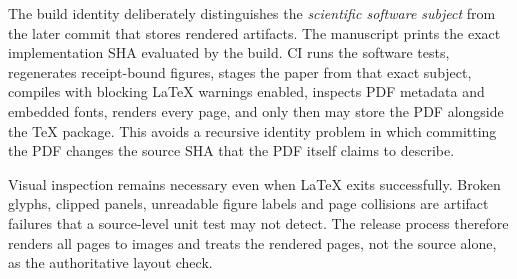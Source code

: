 The build identity deliberately distinguishes the \emph{scientific software subject} from the later commit that stores rendered artifacts. The manuscript prints the exact implementation SHA evaluated by the build. CI runs the software tests, regenerates receipt-bound figures, stages the paper from that exact subject, compiles with blocking LaTeX warnings enabled, inspects PDF metadata and embedded fonts, renders every page, and only then may store the PDF alongside the TeX package. This avoids a recursive identity problem in which committing the PDF changes the source SHA that the PDF itself claims to describe.

Visual inspection remains necessary even when LaTeX exits successfully. Broken glyphs, clipped panels, unreadable figure labels and page collisions are artifact failures that a source-level unit test may not detect. The release process therefore renders all pages to images and treats the rendered pages, not the source alone, as the authoritative layout check.
